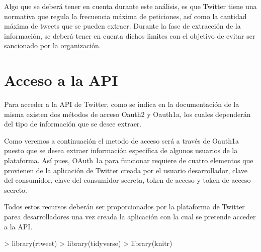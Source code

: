 Algo que se deberá tener en cuenta durante este análisis, es que Twitter tiene una normativa que regula 
la frecuencia máxima de peticiones, así como la cantidad máxima de tweets que se pueden extraer. Durante 
la fase de extracción de la información, se deberá tener en cuenta dichos limites con el objetivo de 
evitar ser sancionado por la organización.

\section{Acceso a la API}
\label{sec:acceso-api}

Para acceder a la API de Twitter, como se indica en la documentación de la misma existen dos métodos de 
acceso Oauth2 y Oauth1a, los cuales dependerán del tipo de información que se desee extraer.

Como veremos a continuación el metodo de acceso será a través de Oauth1a puesto que se desea extraer 
información específica de algunos usuarios de la plataforma. Así pues, OAuth 1a para funcionar requiere 
de cuatro elementos que provienen de la aplicación de Twitter creada por el usuario desarrollador, clave 
del consumidor, clave del consumidor secreta, token de acceso y token de acceso secreto.

Todos estos recursos deberán ser proporcionados por la plataforma de Twitter parea desarrolladores una 
vez creada la aplicación con la cual se pretende acceder a la API.

\begin{Schunk}
\begin{Sinput}
>   library(rtweet)
>   library(tidyverse)
>   library(knitr)
\end{Sinput}
\end{Schunk}




